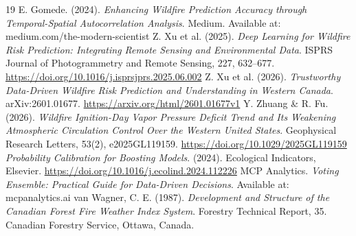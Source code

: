 \documentclass[11pt]{article}
\begin{document}
\begin{thebibliography}{19}
 E. Gomede. (2024). \textit{Enhancing Wildfire Prediction Accuracy through Temporal-Spatial Autocorrelation Analysis}. Medium. Available at: medium.com/the-modern-scientist
 Z. Xu et al. (2025). \textit{Deep Learning for Wildfire Risk Prediction: Integrating Remote Sensing and Environmental Data}. ISPRS Journal of Photogrammetry and Remote Sensing, 227, 632--677. \url{https://doi.org/10.1016/j.isprsjprs.2025.06.002}
 Z. Xu et al. (2026). \textit{Trustworthy Data-Driven Wildfire Risk Prediction and Understanding in Western Canada}. arXiv:2601.01677. \url{https://arxiv.org/html/2601.01677v1}
 Y. Zhuang \& R. Fu. (2026). \textit{Wildfire Ignition-Day Vapor Pressure Deficit Trend and Its Weakening Atmospheric Circulation Control Over the Western United States}. Geophysical Research Letters, 53(2), e2025GL119159. \url{https://doi.org/10.1029/2025GL119159}
 \textit{Probability Calibration for Boosting Models}. (2024). Ecological Indicators, Elsevier. \url{https://doi.org/10.1016/j.ecolind.2024.112226}
 MCP Analytics. \textit{Voting Ensemble: Practical Guide for Data-Driven Decisions}. Available at: mcpanalytics.ai
 van Wagner, C. E. (1987). \textit{Development and Structure of the Canadian Forest Fire Weather Index System}. Forestry Technical Report, 35. Canadian Forestry Service, Ottawa, Canada.
\end{thebibliography}
\end{document}
